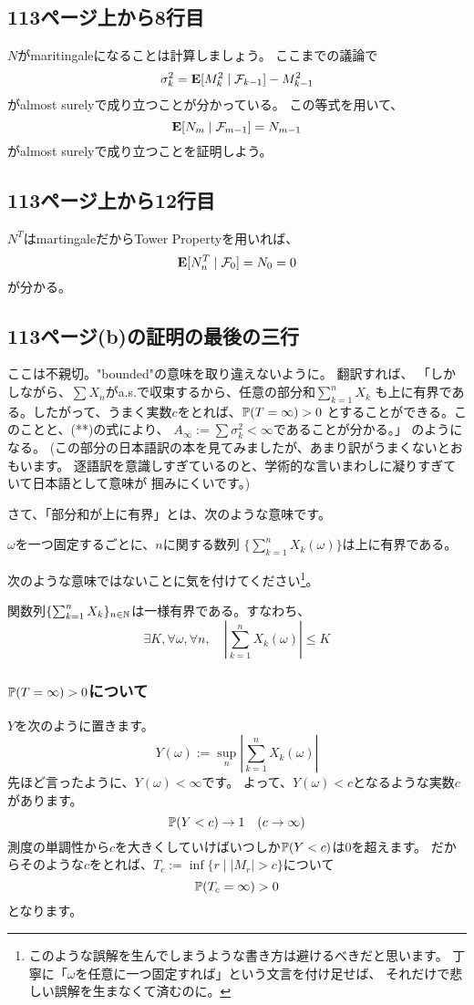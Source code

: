  \subsection{113ページ上から8行目}
    $N$がmaritingaleになることは計算しましょう。
    ここまでの議論で
    \[\sigma_k^2 = {\mathbf{E}}[M_k^2 \mid \mathcal{F}_{k-1}] - M_{k-1}^2\]
    がalmost surelyで成り立つことが分かっている。
    この等式を用いて、
    \[{\mathbf{E}}[N_m \mid \mathcal{F}_{m-1}] = N_{m-1}\]
    がalmost surelyで成り立つことを証明しよう。
  \subsection{113ページ上から12行目}
    $N^T$はmartingaleだからTower Propertyを用いれば、
    \[{\mathbf{E}}[N_n^T \mid \mathcal{F}_0] = N_0 = 0\]
    が分かる。
  \subsection{113ページ(b)の証明の最後の三行}
    ここは不親切。"bounded"の意味を取り違えないように。
    翻訳すれば、
    「しかしながら、$\sum X_n$がa.s.で収束するから、任意の部分和$\sum_{k=1}^n X_k$
    も上に有界である。したがって、うまく実数$c$をとれば、${\mathbb{P}}(T= \infty) > 0$
    とすることができる。このことと、(**)の式により、
    $A_{\infty} := \sum \sigma_k^2 < \infty$であることが分かる。」
    のようになる。
    (この部分の日本語訳の本を見てみましたが、あまり訳がうまくないとおもいます。
    逐語訳を意識しすぎているのと、学術的な言いまわしに凝りすぎていて日本語として意味が
    掴みにくいです。)

    さて、「部分和が上に有界」とは、次のような意味です。
    \begin{center}
      $\omega$を一つ固定するごとに、$n$に関する数列
      $\{\sum_{k=1}^n X_k(\omega)\}$は上に有界である。
    \end{center}
    次のような意味ではないことに気を付けてください\footnote{このような誤解を生んでしまうような書き方は避けるべきだと思います。
    丁寧に「$\omega$を任意に一つ固定すれば」という文言を付け足せば、
    それだけで悲しい誤解を生まなくて済むのに。}。
    \begin{center}
      関数列$\{\sum_{k=1}^n X_k\}_{n \in {\mathbb{N}}}$は一様有界である。すなわち、
      \[\exists K ,\forall \omega, \forall n, \quad |\sum_{k=1}^n X_k(\omega)| \leq K\]
    \end{center}

    \subsubsection{${\mathbb{P}}(T= \infty) > 0$について}
      $Y$を次のように置きます。
      \[Y(\omega) := \sup_n \left|\sum_{k=1}^n X_k(\omega) \right|\]
      先ほど言ったように、$Y(\omega) < \infty$です。
      よって、$Y(\omega) < c$となるような実数$c$があります。
      \[{\mathbb{P}}(Y < c) \rightarrow 1 \quad (c \rightarrow \infty)\]
      測度の単調性から$c$を大きくしていけばいつしか${\mathbb{P}}(Y < c)$は$0$を超えます。
      だからそのような$c$をとれば、$T_c := \inf\{r \mid |M_r| > c\}$について
      \[{\mathbb{P}}(T_c = \infty) > 0\]
      となります。

